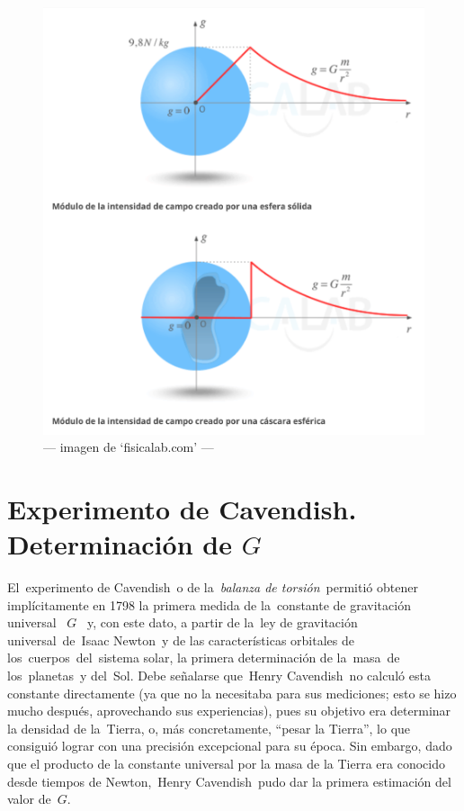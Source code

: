 \begin{figure}[H]
	\centering
	\includegraphics[width=.95\textwidth]{imagenes/imagenes15/T15IM05.png}
	\caption*{--- imagen de `fisicalab.com' ---}
\end{figure}

\section{Experimento de Cavendish. Determinación de $G$}

El experimento de Cavendish o de la \emph{balanza de torsión} permitió obtener implícitamente en 1798 la primera medida de la constante de gravitación universal  $G$  y, con este dato, a partir de la ley de gravitación universal de Isaac Newton y de las características orbitales de los cuerpos del sistema solar, la primera determinación de la masa de los planetas y del Sol. Debe señalarse que Henry Cavendish no calculó esta constante directamente (ya que no la necesitaba para sus mediciones; esto se hizo mucho después, aprovechando sus experiencias), pues su objetivo era determinar la densidad de la Tierra, o, más concretamente, ``pesar la Tierra'', lo que consiguió lograr con una precisión excepcional para su época. Sin embargo, dado que el producto de la constante universal por la masa de la Tierra era conocido desde tiempos de Newton, Henry Cavendish pudo dar la primera estimación del valor de $G$.

